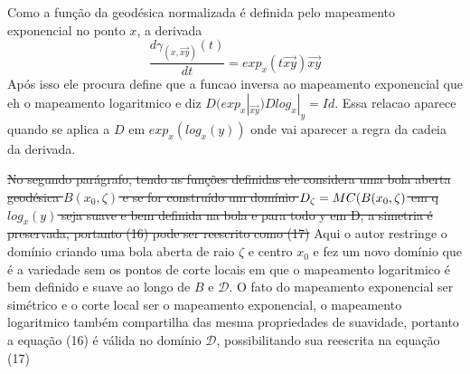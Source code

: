 \documentclass[a4paper,titlepage]{article}
\begin{document}
Como a função da geodésica normalizada é definida pelo mapeamento exponencial no ponto $x$, a derivada 
{
\begin{equation}
	\frac{d\gamma_{(x,\overrightarrow{xy})}(t)}{dt} = exp_{x}(t \overrightarrow{xy})\overrightarrow{xy}
\end{equation}
}
Após isso ele procura define que a funcao inversa ao mapeamento exponencial que eh o mapeamento logaritmico e diz $D(exp_{x}|_{\overrightarrow{xy}})Dlog_{x}|_y=Id$. Essa relacao aparece quando se aplica a $D$ em $exp_{x}(log_x(y))$ onde vai aparecer a regra da cadeia da derivada.  

{
\vspace{1em}
\vspace{1em}
}

\sout{ No segundo parágrafo, tendo as funções definidas ele considera uma bola
aberta geodésica $B(x_0,\zeta)$ e se for construído um domínio $D_{\zeta}=M \\
C(B(x_0,\zeta)$ em q $log_{x}(y)$ seja suave e bem definida na bola e para todo y
em D, a simetria é preservada, portanto (16) pode ser reescrito como (17)}
Aqui o autor restringe o domínio criando uma bola aberta de raio $\zeta$ e centro $x_0$
e fez um novo domínio que é a variedade sem os pontos de corte locais em que o mapeamento logaritmico é bem definido e suave ao longo de $B$ e $\mathcal{D}$. O fato do mapeamento exponencial ser simétrico e o corte local ser o mapeamento exponencial, o mapeamento logaritmico também compartilha das mesma propriedades de suavidade, portanto a equação (16) é válida no domínio $\mathcal{D}$, possibilitando sua reescrita na equação (17)
\end{document}
